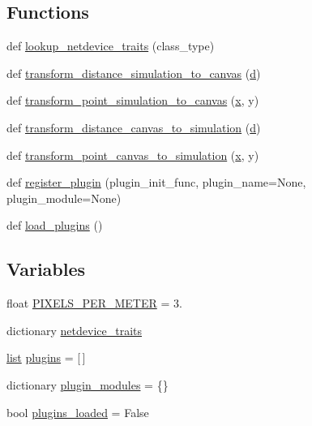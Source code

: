 \subsection*{Functions}
\begin{DoxyCompactItemize}
\item 
def \hyperlink{namespacevisualizer_1_1base_af39afc8b2f4873f698357f02298661db}{lookup\+\_\+netdevice\+\_\+traits} (class\+\_\+type)
\item 
def \hyperlink{namespacevisualizer_1_1base_a653f2b3d1bace2cc520f4e286e86dbb9}{transform\+\_\+distance\+\_\+simulation\+\_\+to\+\_\+canvas} (\hyperlink{lte__pathloss_8m_a1aabac6d068eef6a7bad3fdf50a05cc8}{d})
\item 
def \hyperlink{namespacevisualizer_1_1base_af541810b290cffa16a241008ddaec285}{transform\+\_\+point\+\_\+simulation\+\_\+to\+\_\+canvas} (\hyperlink{lte__link__budget__x2__handover__measures_8m_a9336ebf25087d91c818ee6e9ec29f8c1}{x}, y)
\item 
def \hyperlink{namespacevisualizer_1_1base_a6dac2b96a6a2e3481ea8b539886d4f3b}{transform\+\_\+distance\+\_\+canvas\+\_\+to\+\_\+simulation} (\hyperlink{lte__pathloss_8m_a1aabac6d068eef6a7bad3fdf50a05cc8}{d})
\item 
def \hyperlink{namespacevisualizer_1_1base_ab62211702b7dd347fc313c7fb560fda1}{transform\+\_\+point\+\_\+canvas\+\_\+to\+\_\+simulation} (\hyperlink{lte__link__budget__x2__handover__measures_8m_a9336ebf25087d91c818ee6e9ec29f8c1}{x}, y)
\item 
def \hyperlink{namespacevisualizer_1_1base_a6b0ffcff1e17ec4027496f50177e5b9e}{register\+\_\+plugin} (plugin\+\_\+init\+\_\+func, plugin\+\_\+name=None, plugin\+\_\+module=None)
\item 
def \hyperlink{namespacevisualizer_1_1base_ad171497a5ff1afe0a73bedaebf35448f}{load\+\_\+plugins} ()
\end{DoxyCompactItemize}
\subsection*{Variables}
\begin{DoxyCompactItemize}
\item 
float \hyperlink{namespacevisualizer_1_1base_af35c8b2cbead9421cc440e02440243e0}{P\+I\+X\+E\+L\+S\+\_\+\+P\+E\+R\+\_\+\+M\+E\+T\+ER} = 3.
\item 
dictionary \hyperlink{namespacevisualizer_1_1base_a1f2408e853bc294e15d23933980b15bf}{netdevice\+\_\+traits}
\item 
\hyperlink{openflow-interface_8h_afd9bcfa176617760671b67580f536fa7}{list} \hyperlink{namespacevisualizer_1_1base_a2d0082175fce0f1d28000f676c2646e5}{plugins} = \mbox{[}$\,$\mbox{]}
\item 
dictionary \hyperlink{namespacevisualizer_1_1base_a4803d9b178f6baf0c0a862d04c5cabe9}{plugin\+\_\+modules} = \{\}
\item 
bool \hyperlink{namespacevisualizer_1_1base_ae24240e727692b5799a824eb53b5849c}{plugins\+\_\+loaded} = False
\end{DoxyCompactItemize}


